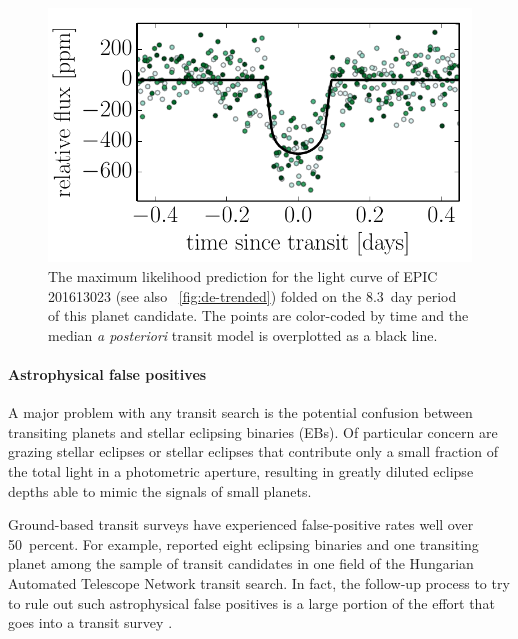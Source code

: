 \documentclass[12pt,preprint]{aastex}
\newcommand{\figref}[1]{\ref{fig:#1}}
\newcommand{\Fig}[1]{\figurename~\figref{#1}}
\newcommand{\fig}[1]{\Fig{#1}}
\newcommand{\figlabel}[1]{\label{fig:#1}}
\begin{document}
\begin{figure}[p]
\begin{center}
\includegraphics{figures/folded.pdf}
\end{center}
\caption{%
The maximum likelihood prediction for the light curve of EPIC 201613023 (see
also \fig{de-trended}) folded on the 8.3~day period of this planet candidate.
The points are color-coded by time and the median \emph{a posteriori} transit
model is overplotted as a black line.
\figlabel{folded}}
\end{figure}


\paragraph{Astrophysical false positives}

A major problem with any transit search is the potential confusion
between transiting planets and stellar eclipsing binaries (EBs).  Of
particular concern are grazing stellar eclipses or stellar eclipses
that contribute only a small fraction of the total light in a
photometric aperture, resulting in greatly diluted eclipse depths able
to mimic the signals of small planets.

Ground-based transit surveys have experienced false-positive rates
well over 50~percent.  For example, \citet{Latham:2009} reported eight
eclipsing binaries and one transiting planet among the sample of
transit candidates in one field of the Hungarian Automated Telescope
Network transit search.  In fact, the follow-up process to try to rule
out such astrophysical false positives is a large portion of the
effort that goes into a transit survey
\citep[e.g.,][]{Odonovan:2006,Almenara:2009,Poleski:2010}.
\end{document}
